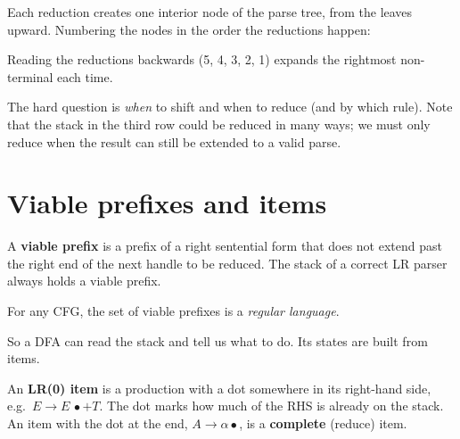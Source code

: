Each reduction creates one interior node of the parse tree, from the leaves upward. Numbering
the nodes in the order the reductions happen:
\begin{center}
\end{center}
Reading the reductions backwards (5, 4, 3, 2, 1) expands the rightmost non-terminal each time.

The hard question is \emph{when} to shift and when to reduce (and by which rule). Note that
the stack in the third row could be reduced in many ways; we must only reduce when the result
can still be extended to a valid parse.

\section{Viable prefixes and items}

\begin{definition}
A \textbf{viable prefix} is a prefix of a right sentential form that does not extend past the
right end of the next handle to be reduced. The stack of a correct LR parser always holds a
viable prefix.
\end{definition}

\begin{theorem}[Knuth, 1965]
For any CFG, the set of viable prefixes is a \emph{regular language}.
\end{theorem}

So a DFA can read the stack and tell us what to do. Its states are built from items.

\begin{definition}
An \textbf{LR(0) item} is a production with a dot somewhere in its right-hand side, e.g.\
$E\to E\,\bullet + T$. The dot marks how much of the RHS is already on the stack. An item
with the dot at the end, $A\to\alpha\bullet$, is a \textbf{complete} (reduce) item.
\end{definition}

